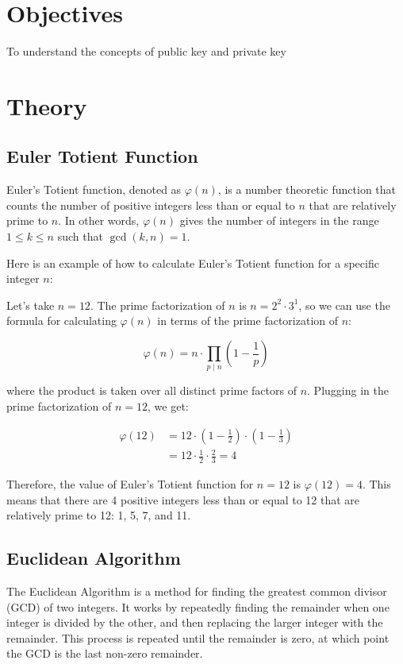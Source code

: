 \documentclass[openany]{book}
\begin{document}
\section{Objectives}
To understand the concepts of public key and private key

\section{Theory}

\subsection{Euler Totient Function}
Euler's Totient function, denoted as $\varphi(n)$, is a number theoretic function that counts the number of positive integers less than or equal to $n$ that are relatively prime to $n$. In other words, $\varphi(n)$ gives the number of integers in the range $1 \leq k \leq n$ such that $\gcd(k, n) = 1$.

Here is an example of how to calculate Euler's Totient function for a specific integer $n$:

Let's take $n = 12$. The prime factorization of $n$ is $n = 2^2 \cdot 3^1$, so we can use the formula for calculating $\varphi(n)$ in terms of the prime factorization of $n$:

$$\varphi(n) = n \cdot \prod_{p \mid n} \left(1 - \frac{1}{p}\right)$$

where the product is taken over all distinct prime factors of $n$. Plugging in the prime factorization of $n = 12$, we get:

\begin{align*}
\varphi(12) &= 12 \cdot \left(1 - \frac{1}{2}\right) \cdot \left(1 - \frac{1}{3}\right) \\
&= 12 \cdot \frac{1}{2} \cdot \frac{2}{3} = 4
\end{align*}

Therefore, the value of Euler's Totient function for $n = 12$ is $\varphi(12) = 4$. This means that there are 4 positive integers less than or equal to 12 that are relatively prime to 12: 1, 5, 7, and 11.

\subsection{Euclidean Algorithm}
The Euclidean Algorithm is a method for finding the greatest common divisor (GCD) of two integers. It works by repeatedly finding the remainder when one integer is divided by the other, and then replacing the larger integer with the remainder. This process is repeated until the remainder is zero, at which point the GCD is the last non-zero remainder.
\end{document}
